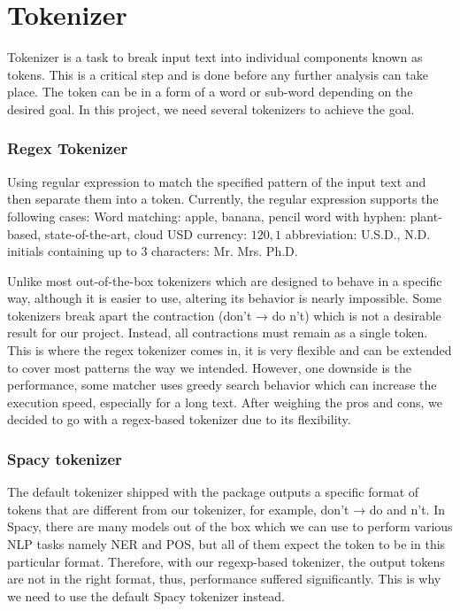 \documentclass[12pt,oneside,openright,a4paper]{cpe-english-project}
\begin{document}
\section{Tokenizer}
Tokenizer is a task to break input text into individual components known as tokens. This is a critical step and is done before any further analysis can take place. The token can be in a form of a word or sub-word depending on the desired goal. In this project, we need several tokenizers to achieve the goal.
\subsubsection{Regex Tokenizer}
Using regular expression to match the specified pattern of the input text and then separate them into a token. Currently, the regular expression supports the following cases: 
Word matching: apple, banana, pencil
word with hyphen: plant-based, state-of-the-art, cloud
USD currency: $120, 1$
abbreviation: U.S.D., N.D.
initials containing up to 3 characters: Mr. Mrs. Ph.D.

	Unlike most out-of-the-box tokenizers which are designed to behave in a specific way, although it is easier to use, altering its behavior is nearly impossible. Some tokenizers break apart the contraction (don’t → do n’t) which is not a desirable result for our project. Instead, all contractions must remain as a single token. This is where the regex tokenizer comes in, it is very flexible and can be extended to cover most patterns the way we intended. However, one downside is the performance, some matcher uses greedy search behavior which can increase the execution speed, especially for a long text.  After weighing the pros and cons, we decided to go with a regex-based tokenizer due to its flexibility.

\subsubsection{Spacy tokenizer}
The default tokenizer shipped with the package outputs a specific format of tokens that are different from our tokenizer, for example, don’t → do and n’t. In Spacy, there are many models out of the box which we can use to perform various NLP tasks namely NER and POS, but all of them expect the token to be in this particular format. Therefore, with our regexp-based tokenizer, the output tokens are not in the right format, thus, performance suffered significantly. This is why we need to use the default Spacy tokenizer instead.
\end{document}

